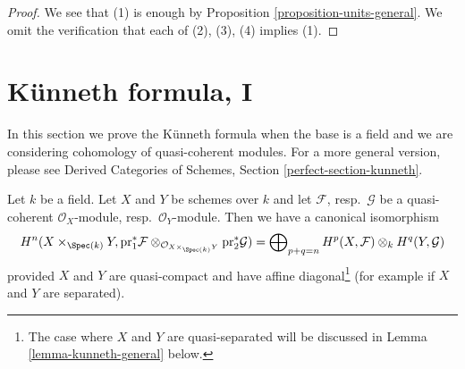 \begin{proof}
We see that (1) is enough by
Proposition \ref{proposition-units-general}.
We omit the verification that each of (2), (3), (4) implies (1).
\end{proof}







\section{K\"unneth formula, I}
\label{section-kunneth}

\noindent
In this section we prove the K\"unneth formula when the base
is a field and we are considering cohomology of quasi-coherent
modules. For a more general version, please see
Derived Categories of Schemes, Section \ref{perfect-section-kunneth}.

\begin{lemma}
\label{lemma-kunneth}
Let $k$ be a field. Let $X$ and $Y$ be schemes over $k$ and
let $\mathcal{F}$, resp.\ $\mathcal{G}$ be a quasi-coherent
$\mathcal{O}_X$-module, resp.\ $\mathcal{O}_Y$-module.
Then we have a canonical isomorphism
$$
H^n(X \times_{\Spec(k)} Y, \text{pr}_1^*\mathcal{F}
\otimes_{\mathcal{O}_{X \times_{\Spec(k)} Y}} \text{pr}_2^*\mathcal{G}) =
\bigoplus\nolimits_{p + q = n}
H^p(X, \mathcal{F}) \otimes_k H^q(Y, \mathcal{G})
$$
provided $X$ and $Y$ are quasi-compact and have affine
diagonal\footnote{The case where $X$ and $Y$ are quasi-separated
will be discussed in Lemma \ref{lemma-kunneth-general} below.}
(for example if $X$ and $Y$ are separated).
\end{lemma}

